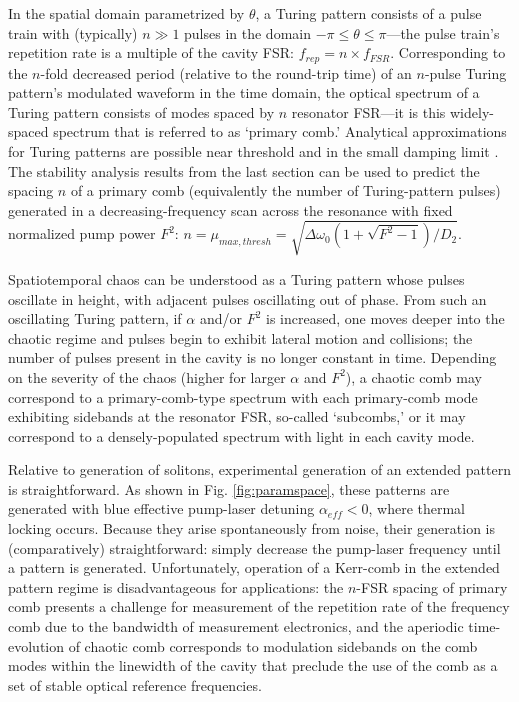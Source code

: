 {In the spatial domain parametrized by $\theta$, a Turing pattern consists of a pulse train with (typically) $n\gg1$ pulses in the domain $-\pi\leq\theta\leq\pi$---the pulse train's repetition rate is a multiple of the cavity FSR: $f_{rep}=n\times f_{FSR}$. Corresponding to the $n$-fold decreased period (relative to the round-trip time) of an $n$-pulse Turing pattern's modulated waveform in the time domain, the optical spectrum of a Turing pattern consists of modes spaced by $n$ resonator FSR---it is this widely-spaced spectrum that is referred to as `primary comb.'  Analytical approximations for Turing patterns are possible near threshold \cite{Lugiato1987,Lugiato1987a} and in the small damping limit \cite{Renninger2016}. The stability analysis results from the last section can be used to predict the spacing $n$ of a primary comb (equivalently the number of Turing-pattern pulses) generated in a decreasing-frequency scan across the resonance with fixed normalized pump power $F^2$: $n=\mu_{max,thresh}=\sqrt{\Delta\omega_0(1+\sqrt{F^2-1})/D_2}$.

Spatiotemporal chaos can be understood as a Turing pattern whose pulses oscillate in height, with adjacent pulses oscillating out of phase. From such an oscillating Turing pattern, if $\alpha$ and/or $F^2$ is increased, one moves deeper into the chaotic regime and pulses begin to exhibit lateral motion and collisions; the number of pulses present in the cavity is no longer constant in time. Depending on the severity of the chaos (higher for larger $\alpha$ and $F^2$), a chaotic comb may correspond to a primary-comb-type spectrum with each primary-comb mode exhibiting sidebands at the resonator FSR, so-called `subcombs,' or it may correspond to a densely-populated spectrum with light in each cavity mode.

Relative to generation of solitons, experimental generation of an extended pattern is straightforward. As shown in Fig. \ref{fig:paramspace}, these patterns are generated with blue effective pump-laser detuning $\alpha_{eff}<0$, where thermal locking occurs. Because they arise spontaneously from noise, their generation is (comparatively) straightforward: simply decrease the pump-laser frequency until a pattern is generated. Unfortunately, operation of a Kerr-comb in the extended pattern regime is disadvantageous for applications: the $n$-FSR spacing of primary comb presents a challenge for measurement of the repetition rate of the frequency comb due to the bandwidth of measurement electronics, and the aperiodic time-evolution of chaotic comb corresponds to modulation sidebands on the comb modes within the linewidth of the cavity that preclude the use of the comb as a set of stable optical reference frequencies. 

}
